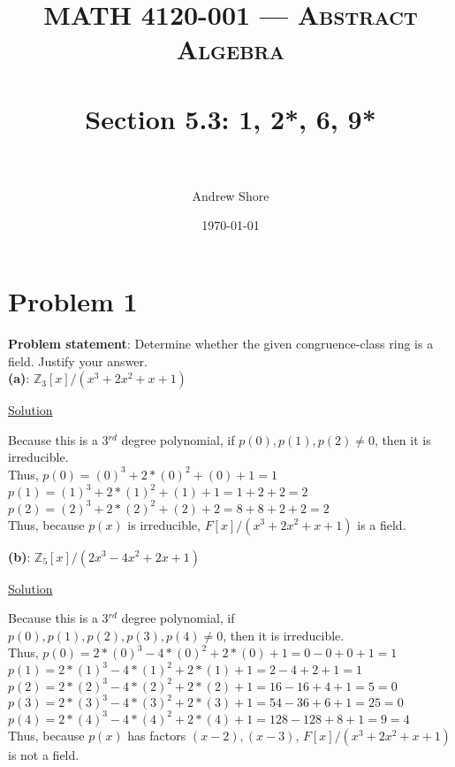 \documentclass{article} %
\title{ 
\normalfont \normalsize 
\textsc{MATH 4120-001 --- Abstract Algebra} \\
\horrule{0.5pt} \\[0cm] %
\huge Section  5.3: 1, 2*, 6, 9*\\ %
\horrule{2pt} \\[0cm] %
}
\author{Andrew Shore} %
\date{\normalsize\today} %
\begin{document}
\maketitle %

\section*{Problem 1}


\textbf{Problem statement}: Determine whether the given congruence-class ring is a field.  Justify your answer.
\\
\textbf{(a)}: $\mathbb{Z}_3[x]/(x^3+2x^2+x+1)$
\begin{addmargin}[1em]{0em}
\underline{Solution}
\begin{addmargin}[1em]{0em}
Because this is a 3$^{rd}$ degree polynomial, if $p(0), p(1), p(2) \neq 0$, then it is irreducible.
\\Thus, $p(0) = (0)^3 + 2*(0)^2 + (0) + 1 = 1$
\\$p(1) = (1)^3 + 2 * (1)^2 + (1) + 1 = 1 + 2 + 2 = 2$
\\$p(2) = (2)^3 + 2* (2)^2 + (2) + 2 = 8 + 8 + 2 + 2 = 2$
\\Thus, because $p(x)$ is irreducible, $F[x]/(x^3 + 2x^2 + x + 1)$ is a field.
\end{addmargin}
\end{addmargin}
\textbf{(b)}: $\mathbb{Z}_5[x]/(2x^3 - 4x^2 + 2x + 1)$
\begin{addmargin}[1em]{0em}
\underline{Solution}
\begin{addmargin}[1em]{0em}
Because this is a 3$^{rd}$ degree polynomial, if $p(0), p(1), p(2), p(3), p(4) \neq 0$, then it is irreducible.
\\Thus, $p(0) = 2*(0)^3 - 4*(0)^2 + 2*(0) + 1 = 0 - 0 + 0 + 1 = 1$
\\$p(1) = 2*(1)^3 - 4*(1)^2 + 2*(1) + 1 = 2 - 4 + 2 + 1 = 1$
\\$p(2) = 2*(2)^3 - 4*(2)^2 + 2*(2) + 1 = 16 - 16 + 4 + 1 = 5 = 0$
\\$p(3) = 2*(3)^3 - 4*(3)^2 + 2*(3) + 1 = 54 - 36 + 6 + 1 = 25 = 0$
\\$p(4) = 2*(4)^3 - 4*(4)^2 + 2*(4) + 1 = 128 - 128 + 8 + 1 = 9 = 4$
\\Thus, because $p(x)$ has factors $(x-2), (x-3)$, $F[x]/(x^3 + 2x^2 + x + 1)$ is not a field.
\end{addmargin}
\end{addmargin}
\end{document}
